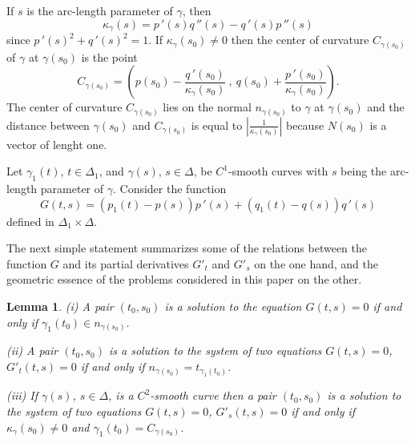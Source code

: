 \documentclass[a4paper,12pt]{amsart}
\newtheorem{lemma}[thm]{Lemma}
\def\g{\gamma}
\begin{document}
If $s$ is the arc-length parameter of $\g$, then
\begin{equation}\label{2}
\kappa_{\g}(s)=p\,'(s)q\,''(s)-q\,'(s)p\,''(s)
\end{equation}
since $p\,'(s)^2+q\,'(s)^2=1$. If
$\kappa_{\g}(s_0)\neq 0$ then the center of
curvature $C_{\g(s_0)}$ of $\g$ at $\g(s_0)$ is the point
\begin{equation}\label{3}
C_{\g(s_0)}=(p(s_0)-\frac{q\,'(s_0)}{\kappa_{\g}(s_0)} \ , \
q(s_0)+\frac{p\,'(s_0)}{\kappa_{\g}(s_0)}).
\end{equation}
The center of curvature $C_{\g(s_0)}$ lies on the normal $n_{\g(s_0)}$ to $\g$ at
$\g(s_0)$ and the distance between $\g(s_0)$
and $C_{\g(s_0)}$ is equal to $|\frac{1}
{\kappa_{\g }(s_0)}|$ because $N(s_0)$ is a vector of lenght one.


Let $\g_1(t)$, $t \in \Delta_1$, and $\g(s)$, $s \in \Delta$, be $C^1$-smooth curves
with  $s$ being the arc-length parameter of  $\g$.  Consider the function
\begin{equation}\label{G}
G(t,s)=(p_1(t)-p(s))p\,'(s)+(q_1(t)-q(s))q\,'(s)
\end{equation}
defined in $\Delta_1 \times \Delta$.

The next simple statement summarizes some of the relations between the function $G$ and its partial derivatives
 $G'_t$ and $G'_s$ on the one hand, and the geometric essence of the problems considered in this paper on the other.

\begin{lemma}\label{l1}
(i) A pair $(t_0, s_0)$ is a solution to the equation $G(t,s)=0$ if and only if $\g_1(t_0) \in n_{\g(s_0)}$.

(ii) A pair $(t_0, s_0)$ is a solution to the system of two equations $G(t,s)=0$,
$G'_t(t,s)=0$ if and only if
$n_{\g(s_0)} = t_{\g_1(t_0)}$.

(iii)  If $\g(s)$, $s \in \Delta$, is a $C^2$-smooth curve then a pair $(t_0, s_0)$ is a solution to the system of two equations $G(t,s)=0$,
$G'_s(t,s)=0$ if and only if $\kappa_{\g}(s_0) \neq 0$ and $\g_1(t_0) = C_{\g(s_0)}$.

\end{lemma}
\end{document}
